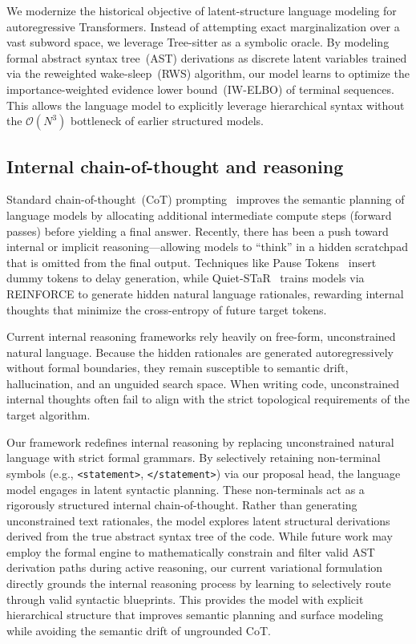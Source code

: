 \documentclass[11pt]{article}
\theoremstyle{plain}
\theoremstyle{definition}
\begin{document}
We modernize the historical objective of latent-structure language modeling for
autoregressive Transformers. Instead of attempting exact marginalization over a
vast subword space, we leverage Tree-sitter as a symbolic oracle. By modeling
formal abstract syntax tree~(AST) derivations as discrete latent
variables trained
via the reweighted wake-sleep~(RWS) algorithm, our model learns to optimize the
importance-weighted evidence lower bound~(IW-ELBO) of terminal sequences. This
allows the language model to explicitly leverage hierarchical syntax without the
\(\mathcal{O}(N^3)\) bottleneck of earlier structured models.

\subsection{Internal chain-of-thought and reasoning}

Standard chain-of-thought~(CoT) prompting~\cite{chain-of-thought} improves the
semantic planning of language models by allocating additional
intermediate compute
steps (forward passes) before yielding a final answer. Recently, there has been
a push toward internal or implicit reasoning---allowing models to ``think'' in a
hidden scratchpad that is omitted from the final output. Techniques like Pause
Tokens~\cite{think-before} insert dummy tokens to delay generation, while
Quiet-STaR~\cite{quiet-star} trains models via REINFORCE to generate hidden
natural language rationales, rewarding internal thoughts that minimize the
cross-entropy of future target tokens.

Current internal reasoning frameworks rely heavily on free-form, unconstrained
natural language. Because the hidden rationales are generated autoregressively
without formal boundaries, they remain susceptible to semantic drift,
hallucination, and an unguided search space. When writing code, unconstrained
internal thoughts often fail to align with the strict topological
requirements of
the target algorithm.

Our framework redefines internal reasoning by replacing unconstrained natural
language with strict formal grammars. By selectively retaining non-terminal
symbols (e.g., \texttt{<statement>}, \texttt{</statement>}) via our proposal
head, the language model engages in latent syntactic planning. These
non-terminals act as a rigorously structured internal chain-of-thought. Rather
than generating unconstrained text rationales, the model explores latent
structural derivations derived from the true abstract syntax tree of the code.
While future work may employ the formal engine to mathematically constrain and
filter valid AST derivation paths during active reasoning, our current
variational formulation directly grounds the internal reasoning process by
learning to selectively route through valid syntactic blueprints. This provides
the model with explicit hierarchical structure that improves semantic planning
and surface modeling while avoiding the semantic drift of ungrounded CoT.
\end{document}
